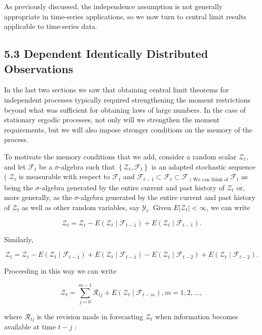 \documentclass[10pt]{article}
\begin{document}
As previously discussed, the independence assumption is not generally appropriate in time-series applications, so we now turn to central limit results applicable to time-series data.

\subsection*{5.3 Dependent Identically Distributed Observations}
In the last two sections we saw that obtaining central limit theorems for independent processes typically required strengthening the moment restrictions beyond what was sufficient for obtaining laws of large numbers. In the case of stationary ergodic processes, not only will we strengthen the moment requirements, but we will also impose stronger conditions on the memory of the process.

To motivate the memory conditions that we add, consider a random scalar $\mathcal{Z}_{t}$, and let $\mathcal{F}_{t}$ be a $\sigma$-algebra such that $\left\{\mathcal{Z}_{t}, \mathcal{F}_{t}\right\}$ is an adapted stochastic sequence ( $\mathcal{Z}_{t}$ is measurable with respect to $\mathcal{F}_{t}$ and $\mathcal{F}_{t-1} \subset \mathcal{F}_{t} \subset \mathcal{F}_{\text {.) We can think of }} \mathcal{F}_{t}$ as being the $\sigma$-algebra generated by the entire current and past history of $\mathcal{Z}_{t}$ or, more generally, as the $\sigma$-algebra generated by the entire current and past history of $\mathcal{Z}_{t}$ as well as other random variables, say $\mathcal{Y}_{t}$. Given $E\left|\mathcal{Z}_{t}\right|<\infty$, we can write

$$
\mathcal{Z}_{t}=\mathcal{Z}_{t}-E\left(\mathcal{Z}_{t} \mid \mathcal{F}_{t-1}\right)+E\left(\mathcal{Z}_{t} \mid \mathcal{F}_{t-1}\right) .
$$

Similarly,

$$
\mathcal{Z}_{t}=\mathcal{Z}_{t}-E\left(\mathcal{Z}_{t} \mid \mathcal{F}_{t-1}\right)+E\left(\mathcal{Z}_{t} \mid \mathcal{F}_{t-1}\right)-E\left(\mathcal{Z}_{t} \mid \mathcal{F}_{t-2}\right)+E\left(\mathcal{Z}_{t} \mid \mathcal{F}_{t-2}\right) .
$$

Proceeding in this way we can write

$$
\mathcal{Z}_{t}=\sum_{j=0}^{m-1} \mathcal{R}_{t j}+E\left(\mathcal{Z}_{t} \mid \mathcal{F}_{t-m}\right), m=1,2, \ldots,
$$

where $\mathcal{R}_{t j}$ is the revision made in forecasting $\mathcal{Z}_{t}$ when information becomes available at time $t-j$ :
\end{document}
